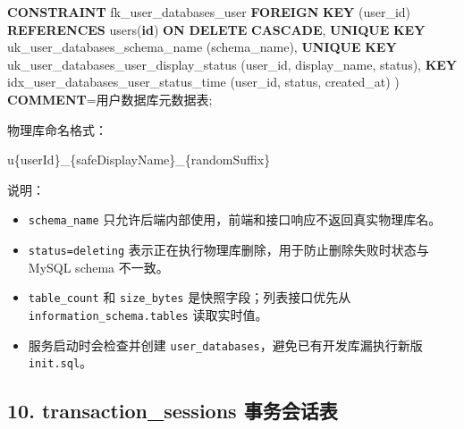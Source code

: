 \documentclass[
  a4paper,
  UTF8]{ctexart}
\newenvironment{Shaded}{}{}
\newcommand{\KeywordTok}[1]{\textcolor[rgb]{0.00,0.44,0.13}{\textbf{#1}}}
\newcommand{\NormalTok}[1]{#1}
\newcommand{\OperatorTok}[1]{\textcolor[rgb]{0.40,0.40,0.40}{#1}}
\newcommand{\StringTok}[1]{\textcolor[rgb]{0.25,0.44,0.63}{#1}}
\providecommand{\tightlist}{%
  \setlength{\itemsep}{0pt}\setlength{\parskip}{0pt}}
\begin{document}
\begin{Shaded}
\begin{Highlighting}[]
  \KeywordTok{CONSTRAINT}\NormalTok{ fk\_user\_databases\_user}
    \KeywordTok{FOREIGN} \KeywordTok{KEY}\NormalTok{ (user\_id) }\KeywordTok{REFERENCES}\NormalTok{ users(}\KeywordTok{id}\NormalTok{)}
    \KeywordTok{ON} \KeywordTok{DELETE} \KeywordTok{CASCADE}\NormalTok{,}
  \KeywordTok{UNIQUE} \KeywordTok{KEY}\NormalTok{ uk\_user\_databases\_schema\_name (schema\_name),}
  \KeywordTok{UNIQUE} \KeywordTok{KEY}\NormalTok{ uk\_user\_databases\_user\_display\_status (user\_id, display\_name, status),}
  \KeywordTok{KEY}\NormalTok{ idx\_user\_databases\_user\_status\_time (user\_id, status, created\_at)}
\NormalTok{) }\KeywordTok{COMMENT}\OperatorTok{=}\StringTok{\textquotesingle{}用户数据库元数据表\textquotesingle{}}\NormalTok{;}
\end{Highlighting}
\end{Shaded}

物理库命名格式：

\begin{Shaded}
\begin{Highlighting}[]
\NormalTok{u\{userId\}\_\{safeDisplayName\}\_\{randomSuffix\}}
\end{Highlighting}
\end{Shaded}

说明：

\begin{itemize}
\tightlist
\item
  \texttt{schema\_name}
  只允许后端内部使用，前端和接口响应不返回真实物理库名。
\item
  \texttt{status=\textquotesingle{}deleting\textquotesingle{}}
  表示正在执行物理库删除，用于防止删除失败时状态与 MySQL schema 不一致。
\item
  \texttt{table\_count} 和 \texttt{size\_bytes}
  是快照字段；列表接口优先从 \texttt{information\_schema.tables}
  读取实时值。
\item
  服务启动时会检查并创建
  \texttt{user\_databases}，避免已有开发库漏执行新版 \texttt{init.sql}。
\end{itemize}

\hypertarget{transaction_sessions-ux4e8bux52a1ux4f1aux8bddux8868}{%
\subsection{10. transaction\_sessions
事务会话表}\label{transaction_sessions-ux4e8bux52a1ux4f1aux8bddux8868}}
\end{document}
